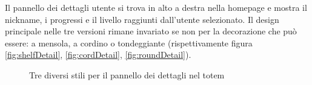 Il pannello dei dettagli utente si trova in alto a destra nella homepage e mostra il nickname, i progressi e il livello raggiunti dall'utente selezionato. Il design principale nelle tre versioni rimane invariato se non per la decorazione che può essere: a mensola, a cordino o tondeggiante (rispettivamente figura \ref{fig:shelfDetail}, \ref{fig:cordDetail}, \ref{fig:roundDetail}).
\begin{figure}
    \centering
    \caption{Tre diversi stili per il pannello dei dettagli nel totem}
    \label{fig:detailBanner}
\end{figure}

